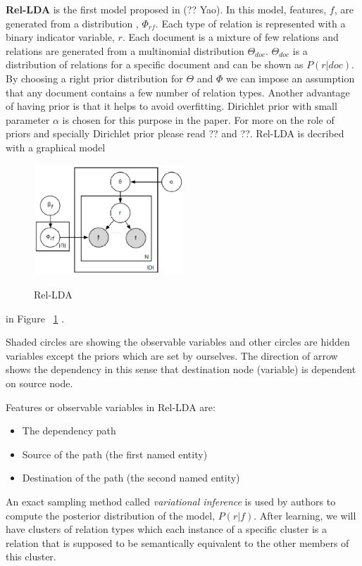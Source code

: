\documentclass[12pt]{report}
\begin{document}
\textbf{Rel-LDA} is the first model proposed in (?? Yao). 
In this model, features, $f$, are generated from a distribution , $\Phi_{rf}$. Each type
 of relation is represented with a binary indicator variable, $r$. Each document is a mixture of few relations
  and relations are generated from a multinomial distribution $\Theta_{doc}$. $\Theta_{doc}$ is a distribution
  of relations for a specific document and can be shown as $P(r|doc)$. By choosing a right prior distribution for $\Theta$
   and $\Phi$ we can impose an assumption that any document contains a few number of relation types. 
   Another advantage of having prior is that it helps to avoid overfitting. Dirichlet prior with small parameter $\alpha$ is 
   chosen for this purpose in the paper. For more on the role of priors and specially Dirichlet prior
    please read ?? and ??.
    Rel-LDA is decribed with a graphical model 
     \begin{figure}[h!]
  \caption{Rel-LDA}
  \centering
    \includegraphics[width=0.5\textwidth]{rel-lda.eps}
    \label{fig:rel-lda}
\end{figure} in Figure ~\ref{fig:rel-lda} .
     
    Shaded circles are showing the observable variables and other circles are hidden variables except 
    the priors which are set by ourselves. The direction of arrow shows the dependency in this sense 
    that destination node (variable) is dependent on source node.
      
    Features or observable variables in Rel-LDA are:
    \begin{itemize}
      \item The dependency path
      \item Source of the path (the first named entity)
      \item Destination of the path (the second named entity)
    \end{itemize}
   	
   	An exact sampling method called \emph{variational inference} is used by authors to compute 
   	the posterior distribution of the model, $P(r|f)$.
   	After learning, we will have clusters of relation types which each instance of a specific cluster 
   	is a relation that is supposed to be semantically equivalent to the other members of this cluster.
   	\\
   	
\end{document}
